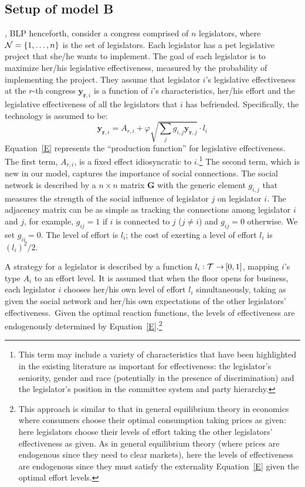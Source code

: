 \documentclass[nojss]{jss}
\begin{document}
\subsection{Setup of model B}\label{sec:modelB}

\cite*{Battaglini+Sciabolazza+Patacchini:2020}, BLP henceforth, consider a
congress comprised of $n$ legislators, where ${\cal N}=\{1,\dots,n\}$ is the
set of legislators.  Each legislator has a pet legislative project that
she/he wants to implement.  The goal of each legislator is to maximize
her/his legislative effectiveness, measured by the probability of
implementing the project.  They assume that legislator $i$'s legislative
effectiveness at the $r$-th congress $\mathbf{y}_{\mathbf{r}, i}$ is a
function of $i$'s characteristics, her/his effort and the legislative
effectiveness of all the legislators that $i$ has befriended.  Specifically,
the technology is assumed to be:
%
\begin{equation}
\mathbf{y}_{\mathbf{r}, i}=A_{r, i}+\varphi \sqrt{\sum_{j}g_{i,j}\mathbf{y}_{\mathbf{r}, j}}\cdot l_{i}
\label{E}
\end{equation}
%
Equation~\ref{E} represents the ``production
function'' for legislative effectiveness.  The first term,
$A_{r, i}$, is a fixed effect idiosyncratic to $i$.\footnote{This term may
include a variety of characteristics that have been highlighted in the
existing literature as important for effectiveness: the legislator's
seniority, gender and race (potentially in the presence of
discrimination) and the legislator's position in the committee system and
party hierarchy.} The second term, which is new in our model, captures the
importance of social connections.  The social network is described by a $%
n\times n$ matrix $\boldsymbol{G}$ with the generic element $g_{i,j}$ that
measures the strength of the social influence of legislator $j$ on
legislator $i$.  The adjacency matrix can be as simple as tracking the
connections among legislator $i$ and $j$, for example, $g_{ij}=1$ if $ i$ is
connected to $j$ ($j\neq i$) and $g_{ij}=0$ otherwise.  We set $g_{ii}=0$. 
The level of effort is $l_{i}$; the cost of exerting a level of effort
$l_{i}$ is $\left( l_{i}\right) ^{2}/2$.

A strategy for a legislator is described by a function $l_{i}:{\cal
T\rightarrow }\left[ 0,1\right]$, mapping $i$'s type $A_{i}$ to an effort
level.  It is assumed that when the floor opens for business, each
legislator $i$ chooses her/his own level of effort $l_{i}$ simultaneously,
taking as given the social network and her/his own expectations of the other
legislators' effectiveness.\ Given the optimal reaction functions, the
levels of effectiveness are endogenously determined by Equation~\ref{E}.\footnote{
This approach is similar to that in general equilibrium theory in economics
where consumers choose their optimal consumption taking prices as given:
here legislators choose their levels of effort taking the other legislators'
effectiveness as given.  As in general equilibrium theory (where prices are
endogenous since they need to clear markets), here the levels of
effectiveness are endogenous since they must satisfy the externality
Equation~\ref{E} given the optimal effort levels.}
\end{document}
